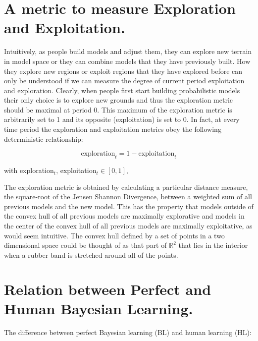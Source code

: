 \section{A metric to measure Exploration and Exploitation.}

Intuitively, as people build models and adjust them, they can explore new terrain in model space or they can combine models that they have previously built. How they explore new regions or exploit regions that they have explored before can only be understood if we can measure the degree of current period exploitation and exploration. Clearly, when people first start building probabilistic models their only choice is to explore new grounds and thus the exploration metric should be maximal at period 0. This maximum of the exploration metric is arbitrarily set to 1 and its opposite (exploitation) is set to 0. In fact, at every time period the exploration and exploitation metrics obey the following deterministic relationship:

$$\text{exploration}_t =1- \text{exploitation}_t$$

with exploration$_t$, exploitation$_t \in \left[0, 1 \right]$, 

The exploration metric is obtained by calculating a particular distance measure, the square-root of the Jensen Shannon Divergence, between a weighted sum of all previous models and the new model. This has the property that models outside of the convex hull of all previous models are maximally explorative and models in the center of the convex hull of all previous models are maximally exploitative, as would seem intuitive. The convex hull defined by a set of points in a two dimensional space could be thought of as that part of $\mathbb{R}^2$ that lies in the interior when a rubber band is stretched around all of the points.

\section{Relation between Perfect and Human Bayesian Learning.}

The difference between perfect Bayesian learning (BL) and human learning (HL):